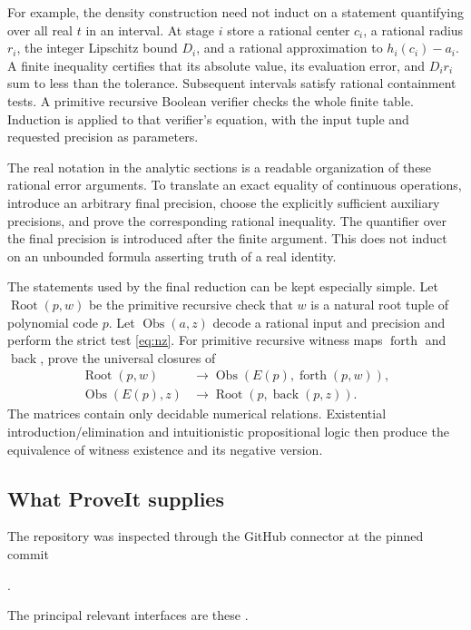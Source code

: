 For example, the density construction need not induct on a statement
quantifying over all real $t$ in an interval. At stage $i$ store a rational
center $c_i$, a rational radius $r_i$, the integer Lipschitz bound $D_i$,
and a rational approximation to $h_i(c_i)-a_i$. A finite inequality
certifies that its absolute value, its evaluation error, and $D_ir_i$
sum to less than the tolerance. Subsequent intervals satisfy rational
containment tests. A primitive recursive Boolean verifier checks the
whole finite table. Induction is applied to that verifier's equation,
with the input tuple and requested precision as parameters.

The real notation in the analytic sections is a readable organization of
these rational error arguments. To translate an exact equality of
continuous operations, introduce an arbitrary final precision, choose the
explicitly sufficient auxiliary precisions, and prove the corresponding
rational inequality. The quantifier over the final precision is introduced
after the finite argument. This does not induct on an unbounded formula
asserting truth of a real identity.

The statements used by the final reduction can be kept especially simple.
Let $\operatorname{Root}(p,w)$ be the primitive recursive check that $w$
is a natural root tuple of polynomial code $p$. Let
$\operatorname{Obs}(a,z)$ decode a rational input and precision and perform
the strict test \eqref{eq:nz}. For primitive recursive witness maps
$\operatorname{forth}$ and $\operatorname{back}$, prove the universal
closures of
\begin{align*}
 \operatorname{Root}(p,w)&\to
   \operatorname{Obs}(E(p),\operatorname{forth}(p,w)),\\
 \operatorname{Obs}(E(p),z)&\to
   \operatorname{Root}(p,\operatorname{back}(p,z)).
\end{align*}
The matrices contain only decidable numerical relations. Existential
introduction/elimination and intuitionistic propositional logic then
produce the equivalence of witness existence and its negative version.

\subsection{What ProveIt supplies}
\label{sec:repo}

The repository was inspected through the GitHub connector at the pinned
commit
\begin{center}\small{}.\end{center}
The principal relevant interfaces are these \cite{proveit}.

